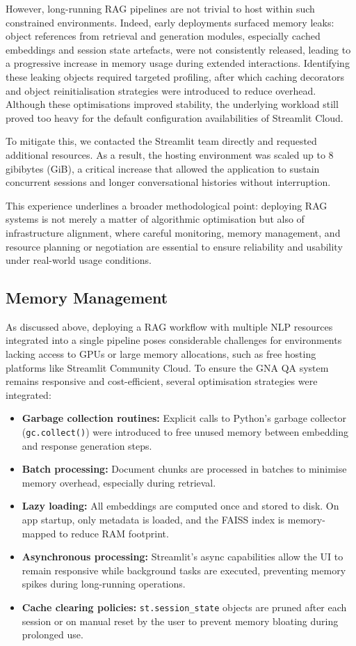 \begin{spacing}{1.5}
However, long-running RAG pipelines are not trivial to host within such constrained environments. Indeed, early deployments surfaced memory leaks: object references from retrieval and generation modules, especially cached embeddings and session state artefacts, were not consistently released, leading to a progressive increase in memory usage during extended interactions. Identifying these leaking objects required targeted profiling, after which caching decorators and object reinitialisation strategies were introduced to reduce overhead. Although these optimisations improved stability, the underlying workload still proved too heavy for the default configuration availabilities of Streamlit Cloud.

To mitigate this, we contacted the Streamlit team directly and requested additional resources. As a result, the hosting environment was scaled up to 8 gibibytes (GiB), a critical increase that allowed the application to sustain concurrent sessions and longer conversational histories without interruption. 

This experience underlines a broader methodological point: deploying RAG systems is not merely a matter of algorithmic optimisation but also of infrastructure alignment, where careful monitoring, memory management, and resource planning or negotiation are essential to ensure reliability and usability under real-world usage conditions.

\subsection{Memory Management}
As discussed above, deploying a RAG workflow with multiple NLP resources integrated into a single pipeline poses considerable challenges for environments lacking access to GPUs or large memory allocations, such as free hosting platforms like Streamlit Community Cloud. To ensure the GNA QA system remains responsive and cost-efficient, several optimisation strategies were integrated:
\begin{itemize}
\item \textbf{Garbage collection routines:} Explicit calls to Python's garbage collector (\texttt{gc.collect()}) were introduced to free unused memory between embedding and response generation steps.
\item \textbf{Batch processing:} Document chunks are processed in batches to minimise memory overhead, especially during retrieval.
\item \textbf{Lazy loading:} All embeddings are computed once and stored to disk. On app startup, only metadata is loaded, and the FAISS index is memory-mapped to reduce RAM footprint.
\item \textbf{Asynchronous processing:} Streamlit's async capabilities allow the UI to remain responsive while background tasks are executed, preventing memory spikes during long-running operations.
\item \textbf{Cache clearing policies:} \texttt{st.session\_state} objects are pruned after each session or on manual reset by the user to prevent memory bloating during prolonged use.
\end{itemize}


\end{spacing}
